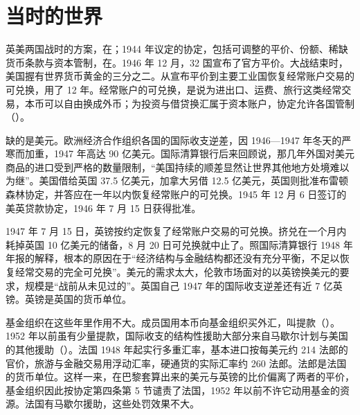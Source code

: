 \section{当时的世界}\label{sec:brettonwoods-world}

英美两国战时的方案，在；1944 年议定的协定，包括可调整的平价、份额、稀缺货币条款与资本管制，在。1946 年 12 月，32 国宣布了官方平价\cite{bordo1993}。大战结束时，美国握有世界货币黄金的三分之二\cite{bordo1993}。从宣布平价到主要工业国恢复经常账户交易的可兑换，用了 12 年\cite{bordo1993}。经常账户的可兑换，是说为进出口、运费、旅行这类经常交易，本币可以自由换成外币；为投资与借贷换汇属于资本账户，协定允许各国管制（）。

缺的是美元。欧洲经济合作组织各国的国际收支逆差，因 1946—1947 年冬天的严寒而加重，1947 年高达 90 亿美元\cite{bordo1993}。国际清算银行后来回顾说，那几年外国对美元商品的进口受到严格的数量限制，“美国持续的顺差显然让世界其他地方处境难以为继”\cite{bis36}。美国借给英国 37.5 亿美元，加拿大另借 12.5 亿美元，英国则批准布雷顿森林协定，并答应在一年以内恢复经常账户的可兑换\cite{bordo1993}。1945 年 12 月 6 日签订的美英贷款协定，1946 年 7 月 15 日获得批准\cite{bis36,bordo1993}。

1947 年 7 月 15 日，英镑按约定恢复了经常账户交易的可兑换。挤兑在一个月内耗掉英国 10 亿美元的储备，8 月 20 日可兑换就中止了\cite{bordo1993}。照国际清算银行 1948 年年报的解释，根本的原因在于“经济结构与金融结构都还没有充分平衡，不足以恢复经常交易的完全可兑换”\cite{bis36}。美元的需求太大，伦敦市场面对的以英镑换美元的要求，规模是“战前从未见过的”\cite{bis36}。英国自己 1947 年的国际收支逆差还有近 7 亿英镑\cite{bis36}。英镑是英国的货币单位。

基金组织在这些年里作用不大。成员国用本币向基金组织买外汇，叫提款（）。1952 年以前虽有少量提款，国际收支的结构性援助大部分来自马歇尔计划与美国的其他援助（）\cite{bordo1993}。法国 1948 年起实行多重汇率，基本进口按每美元约 214 法郎的官价，旅游与金融交易用浮动汇率，硬通货的实际汇率约 260 法郎\cite{bordo1993}。法郎是法国的货币单位。这样一来，在巴黎套算出来的美元与英镑的比价偏离了两者的平价，基金组织因此按协定第四条第 5 节谴责了法国，1952 年以前不许它动用基金的资源\cite{bordo1993}。法国有马歇尔援助，这些处罚效果不大\cite{bordo1993}。

